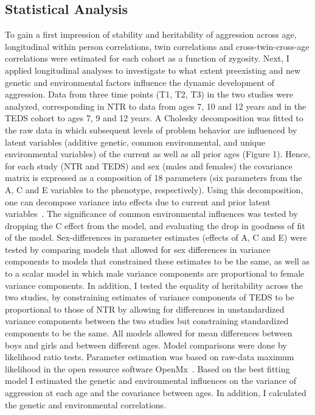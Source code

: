 \subsection{Statistical Analysis}
To gain a first impression of stability and heritability of aggression across age, longitudinal within person correlations, twin correlations and cross-twin-cross-age correlations were estimated for each cohort as a function of zygosity.
Next, I applied longitudinal analyses to investigate to what extent preexisting and new genetic and environmental factors influence the dynamic development of aggression.
Data from three time points (T1, T2, T3) in the two studies were analyzed, corresponding in NTR to data from ages 7, 10 and 12 years and in the TEDS cohort to ages 7, 9 and 12 years.
A Cholesky decomposition was fitted to the raw data in which subsequent levels of problem behavior are influenced by latent variables (additive genetic, common environmental, and unique environmental variables) of the current as well as all prior ages (Figure 1).
Hence, for each study (NTR and TEDS) and sex (males and females) the covariance matrix is expressed as a composition of 18 parameters (six parameters from the A, C and E variables to the phenotype, respectively).
Using this decomposition, one can decompose variance into effects due to current and prior latent variables~\cite{Franic2014}.
The significance of common environmental influences was tested by dropping the C effect from the model, and evaluating the drop in goodness of fit of the model.
Sex-differences in parameter estimates (effects of A, C and E) were tested by comparing models that allowed for sex differences in variance components to models that constrained these estimates to be the same, as well as to a scalar model in which male variance components are proportional to female variance components.
In addition, I tested the equality of heritability across the two studies, by constraining estimates of variance components of TEDS to be proportional to those of NTR by allowing for differences in unstandardized variance components between the two studies but constraining standardized components to be the same.
All models allowed for mean differences between boys and girls and between different ages.
Model comparisons were done by likelihood ratio tests.
Parameter estimation was based on raw-data maximum likelihood in the open resource software OpenMx~\cite{Boker2011}.
Based on the best fitting model I estimated the genetic and environmental influences on the variance of aggression at each age and the covariance between ages.
In addition, I calculated the genetic and environmental correlations.
